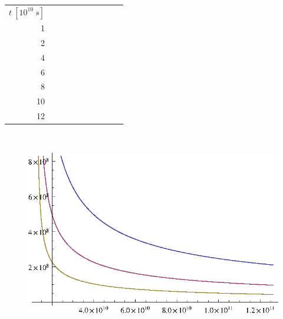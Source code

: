 \begin{center}
\begin{tabular}{|r|l|l|l|l|l|l|l|l|l|}
\hline
\(t~[10^{10}~s]\) & & & & & & & & & \\
\cline{1-1}
1 & & & & & & & & & \\
2 & & & & & & & & & \\
4 & & & & & & & & & \\
6 & & & & & & & & & \\
8 & & & & & & & & & \\
10 & & & & & & & & & \\
12 & & & & & & & & & \\
\hline
\end{tabular}\\
\begin{figure}[ht]
\begin{center}
\includegraphics{aufgabe6u.eps}
\end{center}
\end{figure}
\end{center}
